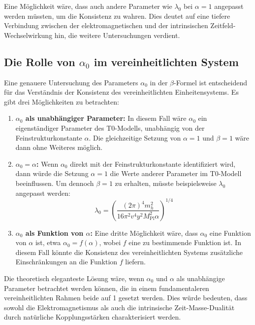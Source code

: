 \documentclass[12pt,a4paper]{article}
\newcommand{\Mpl}{M_{\text{Pl}}}
\begin{document}
	Eine Möglichkeit wäre, dass auch andere Parameter wie \(\lambda_0\) bei \(\alpha = 1\) angepasst werden müssten, um die Konsistenz zu wahren. Dies deutet auf eine tiefere Verbindung zwischen der elektromagnetischen und der intrinsischen Zeitfeld-Wechselwirkung hin, die weitere Untersuchungen verdient.
	
	\subsection{Die Rolle von \(\alpha_0\) im vereinheitlichten System}
	
	Eine genauere Untersuchung des Parameters \(\alpha_0\) in der \(\beta\)-Formel ist entscheidend für das Verständnis der Konsistenz des vereinheitlichten Einheitensystems. Es gibt drei Möglichkeiten zu betrachten:
	
	\begin{enumerate}
		\item \textbf{\(\alpha_0\) als unabhängiger Parameter:} In diesem Fall wäre \(\alpha_0\) ein eigenständiger Parameter des T0-Modells, unabhängig von der Feinstrukturkonstante \(\alpha\). Die gleichzeitige Setzung von \(\alpha = 1\) und \(\beta = 1\) wäre dann ohne Weiteres möglich.
		
		\item \textbf{\(\alpha_0 = \alpha\):} Wenn \(\alpha_0\) direkt mit der Feinstrukturkonstante identifiziert wird, dann würde die Setzung \(\alpha = 1\) die Werte anderer Parameter im T0-Modell beeinflussen. Um dennoch \(\beta = 1\) zu erhalten, müsste beispielsweise \(\lambda_0\) angepasst werden:
		\begin{equation}
			\lambda_0 = \left(\frac{(2\pi)^4 m_h^2}{16 \pi^2 v^4 y^2 \Mpl^2 \alpha}\right)^{1/4}
		\end{equation}
		
		\item \textbf{\(\alpha_0\) als Funktion von \(\alpha\):} Eine dritte Möglichkeit wäre, dass \(\alpha_0\) eine Funktion von \(\alpha\) ist, etwa \(\alpha_0 = f(\alpha)\), wobei \(f\) eine zu bestimmende Funktion ist. In diesem Fall könnte die Konsistenz des vereinheitlichten Systems zusätzliche Einschränkungen an die Funktion \(f\) liefern.
	\end{enumerate}
	
	Die theoretisch eleganteste Lösung wäre, wenn \(\alpha_0\) und \(\alpha\) als unabhängige Parameter betrachtet werden können, die in einem fundamentaleren vereinheitlichten Rahmen beide auf 1 gesetzt werden. Dies würde bedeuten, dass sowohl die Elektromagnetismus als auch die intrinsische Zeit-Masse-Dualität durch natürliche Kopplungsstärken charakterisiert werden.
	
\end{document}

